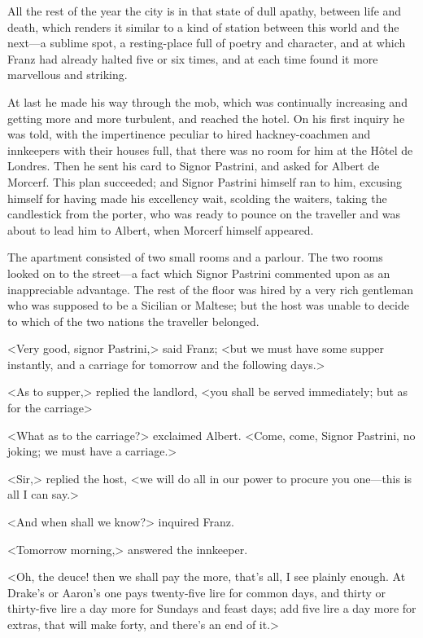  All the rest of the year the city is in that state of dull apathy, between life and death, which renders it similar to a kind of station between this world and the next—a sublime spot, a resting-place full of poetry and character, and at which Franz had already halted five or six times, and at each time found it more marvellous and striking. 

 At last he made his way through the mob, which was continually increasing and getting more and more turbulent, and reached the hotel. On his first inquiry he was told, with the impertinence peculiar to hired hackney-coachmen and innkeepers with their houses full, that there was no room for him at the Hôtel de Londres. Then he sent his card to Signor Pastrini, and asked for Albert de Morcerf. This plan succeeded; and Signor Pastrini himself ran to him, excusing himself for having made his excellency wait, scolding the waiters, taking the candlestick from the porter, who was ready to pounce on the traveller and was about to lead him to Albert, when Morcerf himself appeared. 

 The apartment consisted of two small rooms and a parlour. The two rooms looked on to the street—a fact which Signor Pastrini commented upon as an inappreciable advantage. The rest of the floor was hired by a very rich gentleman who was supposed to be a Sicilian or Maltese; but the host was unable to decide to which of the two nations the traveller belonged. 

 <Very good, signor Pastrini,> said Franz; <but we must have some supper instantly, and a carriage for tomorrow and the following days.> 

 <As to supper,> replied the landlord, <you shall be served immediately; but as for the carriage\longdash> 

 <What as to the carriage?> exclaimed Albert. <Come, come, Signor Pastrini, no joking; we must have a carriage.> 

 <Sir,> replied the host, <we will do all in our power to procure you one—this is all I can say.> 

 <And when shall we know?> inquired Franz. 

 <Tomorrow morning,> answered the innkeeper. 

 <Oh, the deuce! then we shall pay the more, that's all, I see plainly enough. At Drake's or Aaron's one pays twenty-five lire for common days, and thirty or thirty-five lire a day more for Sundays and feast days; add five lire a day more for extras, that will make forty, and there's an end of it.> 

